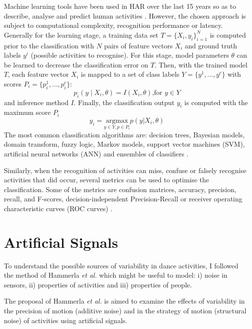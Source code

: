 \documentclass[10pt,journal,compsoc]{IEEEtran}
\begin{document}
Machine learning tools have been used in HAR over the last 15 years
so as to describe, analyse and predict human activities \cite{bulling2014}.
However, the chosen approach is subject to computational complexity,
recognition performance or latency.
Generally for the learning stage, a training data set $T = \{ X_i, y_i \}  ^N _ {i=1}$ 
is computed prior to the classification with $N$ pairs of feature vectors $X_i$ and ground 
truth labels $y^i$ (possible activities to recognise). For this stage, model parameters 
$\theta$ can be learned to decrease the classification error on $T$. 
Then, with the trained model $T$, each feature vector $X_i$  is mapped to a set of class labels 
$Y= \{ y^1, \dots , y^c \}$ with scores $P_i = \{ p^1_i, \dots, p^c_i \}$:
\begin{equation}
p_i ( y \mid X_i, \theta) = I (X_i, \theta) \mbox{,for } y \in Y
\end{equation} 
and inference method $I$.
Finally, the classification output $y_i$ is computed with the maximum score $P_i$
\begin{equation}
y_i  = 
\underset{ y \in Y, p \in P_i }{\text{argmax}}   p(y | X_i, \theta)
\end{equation} 
The most common classification algorithms are: decision trees, Bayesian models,
domain transform, fuzzy logic, Markov models, support vector machines (SVM), 
artificial neural networks (ANN) and ensembles of classifiers \cite{Lara2013}.

Similarly, when the recognition of activities can miss, confuse or falsely
recognise activities that did occur, several metrics
can be used to optimise the classification. Some of the metrics
are confusion matrices, accuracy, precision, recall, and F-scores,
decision-independent Precision-Recall or receiver operating characteristic
curves (ROC curves) \cite{bulling2014}.


\section{Artificial Signals}
To understand the possible sources of variability
in dance activities, I followed the method of Hammerla 
\emph{et al.} \cite{hammerla2011} which might be useful to model:
i) noise in sensors,
ii) properties of activities and 
iii) properties of people.

The proposal of Hammerla \emph{et al.} \cite{hammerla2011}
is aimed to examine the effects of
variability in the precision of motion  (additive noise) 
and in the strategy of motion  (structural noise) of 
activities using artificial signals.
\end{document}
